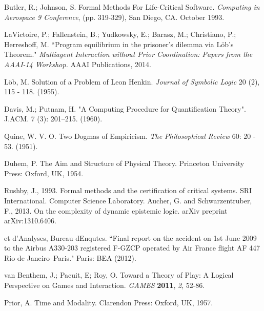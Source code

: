\begin{thebibliography}{9}
	 	Butler, R.; Johnson, S. Formal Methods For Life-Critical Software. \emph{Computing in Aerospace 9 Conference}, (pp. 319-329), San Diego, CA. October 1993.
	 	
	 	LaVictoire, P.; Fallenstein, B.; Yudkowsky, E.; Barasz, M.; Christiano, P.; Herreshoff, M. ``Program  equilibrium  in  the  prisoner’s  dilemma  via L\"ob’s Theorem." {\em Multiagent Interaction without Prior Coordination: Papers from the AAAI-14 Workshop.} AAAI Publications, 2014.
	 	
	 	L\"ob, M. Solution of a Problem of Leon Henkin. {\em Journal of Symbolic Logic} 20 (2), 115 - 118. (1955).
	 	
	 	Davis, M.; Putnam, H. "A Computing Procedure for Quantification Theory". J.ACM. 7 (3): 201–215. (1960).
	 	
	 	Quine, W. V. O. Two Dogmas of Empiricism. {\em The Philosophical Review} 60: 20 - 53. (1951).
	 	
	 	Duhem, P. The Aim and Structure of Physical Theory. Princeton University Press: Oxford, UK, 1954. 
	 	
	 	 Rushby, J., 1993. Formal methods and the certification of critical systems. SRI International. Computer Science Laboratory.
	 	 Aucher, G. and Schwarzentruber, F., 2013. On the complexity of dynamic epistemic logic. arXiv preprint arXiv:1310.6406.
	 	
	 	
	 	
	 	et d'Analyses, Bureau dEnqutes. ``Final report on the accident on 1st June 2009 to the Airbus A330-203 registered F-GZCP operated by Air France flight AF 447 Rio de Janeiro–Paris." Paris: BEA (2012).
	 	
	 	
	 	van Benthem, J.; Pacuit, E; Roy, O. Toward a Theory of Play: A Logical Perspective on Games and Interaction. {\em GAMES} {\bf 2011}, {\em 2}, 52-86.
	 	
	 	Prior, A. Time and Modality. Clarendon Press: Oxford, UK, 1957.
	 	

\end{thebibliography}
